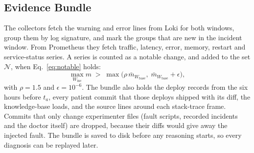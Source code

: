 \documentclass[12pt,onecolumn,draftclsnofoot]{IEEEtran}
\begin{document}
\subsection{Evidence Bundle}
The collectors fetch the warning and error lines from Loki for both windows, group them by log signature, and mark the groups that are new in the incident window. From Prometheus they fetch traffic, latency, error, memory, restart and service-status series. A series is counted as a notable change, and added to the set $\mathcal{N}$, when Eq.~\eqref{eq:notable} holds:
\begin{equation}
\max_{W_{\mathrm{inc}}} m \;>\; \max\!\bigl(\rho\,\bar{m}_{W_{\mathrm{base}}},\; \bar{m}_{W_{\mathrm{base}}}+\epsilon\bigr),
\label{eq:notable}
\end{equation}
with $\rho=1.5$ and $\epsilon=10^{-6}$. The bundle also holds the deploy records from the six hours before $t_a$, every patient commit that those deploys shipped with its diff, the knowledge-base loads, and the source lines around each stack-trace frame. Commits that only change experimenter files (fault scripts, recorded incidents and the doctor itself) are dropped, because their diffs would give away the injected fault. The bundle is saved to disk before any reasoning starts, so every diagnosis can be replayed later.
\end{document}

